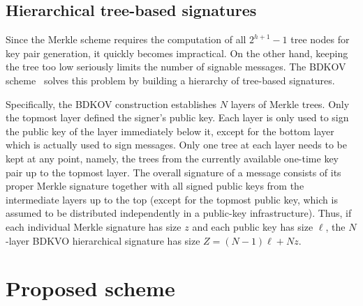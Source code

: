\documentclass[11pt]{llncs}
\begin{document}
\subsection{Hierarchical tree-based signatures}

Since the Merkle scheme requires the computation of all $2^{h+1}-1$ tree nodes for key pair generation, it quickly becomes impractical. On the other hand, keeping the tree too low seriously limits the number of signable messages. The BDKOV scheme~\cite{buchman-dahmen-klintsevich-okeya-vuillaume} solves this problem by building a hierarchy of tree-based signatures.

Specifically, the BDKOV construction establishes $N$ layers of Merkle trees. Only the topmost layer defined the signer's public key. Each layer is only used to sign the public key of the layer immediately below it, except for the bottom layer which is actually used to sign messages. Only one tree at each layer needs to be kept at any point, namely, the trees from the currently available one-time key pair up to the topmost layer. The overall signature of a message consists of its proper Merkle signature together with all signed public keys from the intermediate layers up to the top (except for the topmost public key, which is assumed to be distributed independently in a public-key infrastructure). Thus, if each individual Merkle signature has size $z$ and each public key has size $\ell$, the $N$-layer BDKVO hierarchical signature has size $Z = (N-1)\ell + Nz$.


\section{Proposed scheme}\label{sec:proposal}
\end{document}
